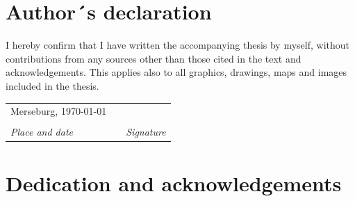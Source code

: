 \vspace{17.1mm}


\section*{{\huge{}Author´s declaration}}

I hereby confirm that I have written the accompanying thesis by myself, without contributions from any sources other than those cited in the text and acknowledgements.
This applies also to all graphics, drawings, maps and images included in the thesis.

\vspace{2cm}

\begin{center}
	\begin{tabular}{@{}p{5cm}@{}p{2cm}@{}p{5cm}}%
		Merseburg, \today & &  \\
		\dotfill & & \dotfill \\
		\emph{Place and date} & & \emph{Signature} \\
	\end{tabular}
	\par
\end{center}

\newpage

\section*{{\huge{}Dedication and acknowledgements}}

%


